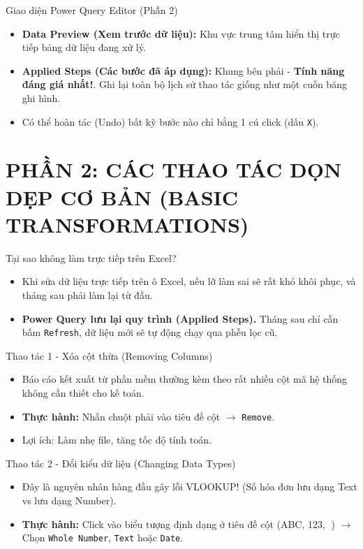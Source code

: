 \documentclass[aspectratio=169]{beamer}
\begin{document}
\begin{frame}{Giao diện Power Query Editor (Phần 2)}
    \begin{itemize}
        \item \textbf{Data Preview (Xem trước dữ liệu):} Khu vực trung tâm hiển thị trực tiếp bảng dữ liệu đang xử lý.
        \item \textbf{Applied Steps (Các bước đã áp dụng):} Khung bên phải - \textbf{Tính năng đáng giá nhất!}. Ghi lại toàn bộ lịch sử thao tác giống như một cuốn băng ghi hình.
        \item Có thể hoàn tác (Undo) bất kỳ bước nào chỉ bằng 1 cú click (dấu \texttt{X}).
    \end{itemize}
\end{frame}


\section{PHẦN 2: CÁC THAO TÁC DỌN DẸP CƠ BẢN (BASIC TRANSFORMATIONS)}


\begin{frame}{Tại sao không làm trực tiếp trên Excel?}
    \begin{itemize}
        \item Khi sửa dữ liệu trực tiếp trên ô Excel, nếu lỡ làm sai sẽ rất khó khôi phục, và tháng sau phải làm lại từ đầu.
        \item \textbf{Power Query lưu lại quy trình (Applied Steps).} Tháng sau chỉ cần bấm \texttt{Refresh}, dữ liệu mới sẽ tự động chạy qua phễu lọc cũ.
    \end{itemize}
\end{frame}


\begin{frame}{Thao tác 1 - Xóa cột thừa (Removing Columns)}
    \begin{itemize}
        \item Báo cáo kết xuất từ phần mềm thường kèm theo rất nhiều cột mã hệ thống không cần thiết cho kế toán.
        \item \textbf{Thực hành:} Nhấn chuột phải vào tiêu đề cột $\rightarrow$ \texttt{Remove}.
        \item Lợi ích: Làm nhẹ file, tăng tốc độ tính toán.
    \end{itemize}
\end{frame}


\begin{frame}{Thao tác 2 - Đổi kiểu dữ liệu (Changing Data Types)}
    \begin{itemize}
        \item Đây là nguyên nhân hàng đầu gây lỗi VLOOKUP! (Số hóa đơn lưu dạng Text vs lưu dạng Number).
        \item \textbf{Thực hành:} Click vào biểu tượng định dạng ở tiêu đề cột (ABC, 123, 📅) $\rightarrow$ Chọn \texttt{Whole Number}, \texttt{Text} hoặc \texttt{Date}.
    \end{itemize}
\end{frame}
\end{document}
